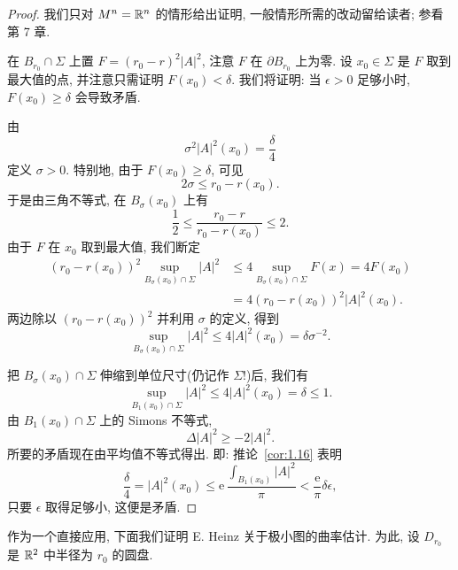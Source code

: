 \begin{proof}
我们只对 $M^n=\mathbb{R}^n$ 的情形给出证明, 一般情形所需的改动留给读者; 参看第 7 章.

在 $B_{r_0}\cap\Sigma$ 上置 $F=(r_0-r)^{2}|A|^{2}$, 注意 $F$ 在 $\partial B_{r_0}$
上为零. 设 $x_0\in\Sigma$ 是 $F$ 取到最大值的点, 并注意只需证明 $F(x_0)<\delta$.
我们将证明: 当 $\epsilon>0$ 足够小时, $F(x_0)\geq\delta$ 会导致矛盾.

由
\begin{equation}
\sigma^{2}|A|^{2}(x_0)=\frac{\delta}{4}
\label{eq:2.32}
\end{equation}
定义 $\sigma>0$. 特别地, 由于 $F(x_0)\geq\delta$, 可见
\begin{equation}
2\sigma\leq r_0-r(x_0).
\label{eq:2.33}
\end{equation}
于是由三角不等式, 在 $B_\sigma(x_0)$ 上有
\[
\frac12\leq\frac{r_0-r}{r_0-r(x_0)}\leq2.
\]
由于 $F$ 在 $x_0$ 取到最大值, 我们断定
\begin{equation}
\begin{aligned}
(r_0-r(x_0))^{2}\sup_{B_\sigma(x_0)\cap\Sigma}|A|^{2}
&\leq4\sup_{B_\sigma(x_0)\cap\Sigma}F(x)=4F(x_0)\\
&=4(r_0-r(x_0))^{2}|A|^{2}(x_0).
\end{aligned}
\label{eq:2.34}
\end{equation}
两边除以 $(r_0-r(x_0))^{2}$ 并利用 $\sigma$ 的定义, 得到
\begin{equation}
\sup_{B_\sigma(x_0)\cap\Sigma}|A|^{2}\leq4|A|^{2}(x_0)=\delta\sigma^{-2}.
\label{eq:2.35}
\end{equation}

把 $B_\sigma(x_0)\cap\Sigma$ 伸缩到单位尺寸(仍记作 $\Sigma$!)后, 我们有
\begin{equation}
\sup_{B_1(x_0)\cap\Sigma}|A|^{2}\leq4|A|^{2}(x_0)=\delta\leq1.
\label{eq:2.36}
\end{equation}
由 $B_1(x_0)\cap\Sigma$ 上的 Simons 不等式,
\begin{equation}
\Delta|A|^{2}\geq-2|A|^{2}.
\label{eq:2.37}
\end{equation}
所要的矛盾现在由平均值不等式得出. 即: 推论~\ref{cor:1.16} 表明
\begin{equation}
\frac{\delta}{4}=|A|^{2}(x_0)
 \leq\mathrm{e}\,\frac{\int_{B_1(x_0)}|A|^{2}}{\pi}
 <\frac{\mathrm{e}}{\pi}\delta\epsilon,
\label{eq:2.38}
\end{equation}
只要 $\epsilon$ 取得足够小, 这便是矛盾.
\end{proof}

作为一个直接应用, 下面我们证明 E. Heinz 关于极小图的曲率估计. 为此, 设
$D_{r_0}$ 是 $\mathbb{R}^2$ 中半径为 $r_0$ 的圆盘.

